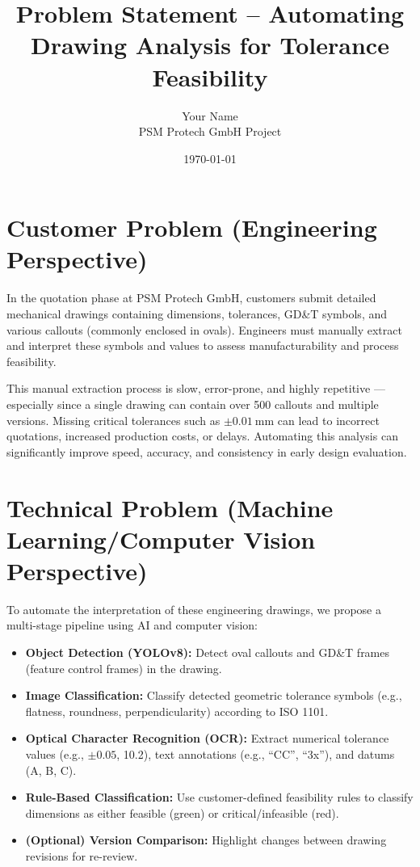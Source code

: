 \documentclass[a4paper,12pt]{article}
\title{\textbf{Problem Statement -- Automating Drawing Analysis for Tolerance Feasibility}}
\author{Your Name \\ PSM Protech GmbH Project}
\date{\today}
\begin{document}
\maketitle

\section*{Customer Problem (Engineering Perspective)}

In the quotation phase at PSM Protech GmbH, customers submit detailed mechanical drawings containing dimensions, tolerances, GD\&T symbols, and various callouts (commonly enclosed in ovals). Engineers must manually extract and interpret these symbols and values to assess manufacturability and process feasibility.

This manual extraction process is slow, error-prone, and highly repetitive --- especially since a single drawing can contain over 500 callouts and multiple versions. Missing critical tolerances such as $\pm 0.01~\text{mm}$ can lead to incorrect quotations, increased production costs, or delays. Automating this analysis can significantly improve speed, accuracy, and consistency in early design evaluation.

\section*{Technical Problem (Machine Learning/Computer Vision Perspective)}

To automate the interpretation of these engineering drawings, we propose a multi-stage pipeline using AI and computer vision:

\begin{itemize}
  \item \textbf{Object Detection (YOLOv8):} Detect oval callouts and GD\&T frames (feature control frames) in the drawing.
  \item \textbf{Image Classification:} Classify detected geometric tolerance symbols (e.g., flatness, roundness, perpendicularity) according to ISO 1101.
  \item \textbf{Optical Character Recognition (OCR):} Extract numerical tolerance values (e.g., $\pm 0.05$, 10.2), text annotations (e.g., ``CC'', ``3x''), and datums (A, B, C).
  \item \textbf{Rule-Based Classification:} Use customer-defined feasibility rules to classify dimensions as either feasible (green) or critical/infeasible (red).
  \item \textbf{(Optional) Version Comparison:} Highlight changes between drawing revisions for re-review.
\end{itemize}
\end{document}
